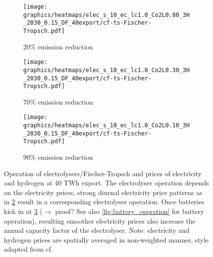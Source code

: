 \begin{figure}[h]
\begin{subfigure}[h]{0.33\textwidth}
    \end{subfigure}


    \begin{subfigure}[h]{0.33\textwidth}
        \centering
        \texttt{[image: graphics/heatmaps/elec\_s\_10\_ec\_lc1.0\_Co2L0.80\_3H\_2030\_0.15\_DF\_40export/cf-ts-Fischer-Tropsch.pdf]}
        \caption{20\% emission reduction}
        \label{fig:operation20}
    \end{subfigure}
    \begin{subfigure}[h]{0.33\textwidth}
        \centering
        \texttt{[image: graphics/heatmaps/elec\_s\_10\_ec\_lc1.0\_Co2L0.30\_3H\_2030\_0.15\_DF\_40export/cf-ts-Fischer-Tropsch.pdf]}
        \caption{70\% emission reduction}
        \label{fig:operation70}
    \end{subfigure}
    \begin{subfigure}[h]{0.33\textwidth}
        \centering
        \texttt{[image: graphics/heatmaps/elec\_s\_10\_ec\_lc1.0\_Co2L0.10\_3H\_2030\_0.15\_DF\_40export/cf-ts-Fischer-Tropsch.pdf]}
        \caption{90\% emission reduction}
        \label{fig:operation90}
    \end{subfigure}

    \caption{Operation of electrolysers/Fischer-Tropsch and prices of electricity and hydrogen at 40 TWh export. The electrolyser operation depends on the electricity prices, strong diurnal electricity price patterns as in \ref{fig:operation70} result in a corresponding electrolyser operation. Once batteries kick in at \ref{fig:operation90} ($\rightarrow$ proof? See also \ref{fig:battery_operation} for battery operation), resulting smoother electricity prices also increase the annual capacity factor of the electrolyser. Note: electricity and hydrogen prices are spatially averaged in non-weighted manner, style adapted from cf. \cite{Neumann2022}}
    \label{fig:ren-cfs}
\end{figure}

\clearpage